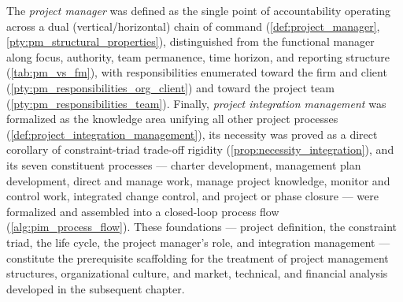 \documentclass[12pt, a4paper]{report}
\theoremstyle{engnotes}
\begin{document}
The \emph{project manager} was defined as the single point of accountability operating across a dual (vertical/horizontal) chain of command (\cref{def:project_manager}, \cref{pty:pm_structural_properties}), distinguished from the functional manager along focus, authority, team permanence, time horizon, and reporting structure (\cref{tab:pm_vs_fm}), with responsibilities enumerated toward the firm and client (\cref{pty:pm_responsibilities_org_client}) and toward the project team (\cref{pty:pm_responsibilities_team}). Finally, \emph{project integration management} was formalized as the knowledge area unifying all other project processes (\cref{def:project_integration_management}), its necessity was proved as a direct corollary of constraint-triad trade-off rigidity (\cref{prop:necessity_integration}), and its seven constituent processes --- charter development, management plan development, direct and manage work, manage project knowledge, monitor and control work, integrated change control, and project or phase closure --- were formalized and assembled into a closed-loop process flow (\cref{alg:pim_process_flow}). These foundations --- project definition, the constraint triad, the life cycle, the project manager's role, and integration management --- constitute the prerequisite scaffolding for the treatment of project management structures, organizational culture, and market, technical, and financial analysis developed in the subsequent chapter.
\end{document}
